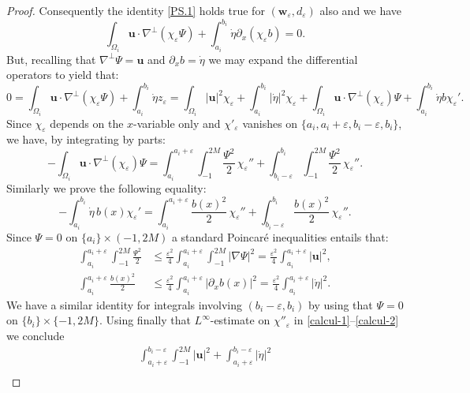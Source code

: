 \documentclass[JEP,XML,SOM,Unicode,NoFloatCountersInSection]{cedram}
\theoremstyle{remark}
\theoremstyle{definition}
\newcommand{\ug}{\boldsymbol{u}}
\newcommand{\wg}{\boldsymbol{w}}
\let\CM\Omega
\newcommand{\etap}{\dot{\eta}}
\begin{document}
\begin{proof}
Consequently the identity \eqref{PS.1} holds true for $(\wg_{\varepsilon},d_{\varepsilon})$ also and we have
\[
\int_{\CM_{i}}\ug\cdot\nabla^{\perp}(\chi_{\varepsilon}\Psi) + \int_{a_{i}}^{b_{i}}\etap \partial_x (\chi_{\varepsilon} b)=0.
\]
But, recalling that $\nabla^{\bot} \Psi = \ug$ and $\partial_x b = \dot{\eta}$ we may expand the differential operators to yield that:
\[
0 = \int_{\CM_{i}}\ug\cdot\nabla^{\perp}(\chi_{\varepsilon}\Psi) + \int_{a_{i}}^{b_{i}}\etap z_\varepsilon=\int_{\CM_{i}}\vert\ug\vert^{2}\chi_\varepsilon + \int_{a_{i}}^{b_{i}}\vert\etap\vert^{2}\chi_\varepsilon + \int_{\CM_{i}}\ug\cdot\nabla^{\perp}(\chi_{\varepsilon})\Psi + \int_{a_{i}}^{b_{i}}\etap b{\chi}_{\varepsilon}'.
\]
Since $\chi_{\varepsilon}$ depends on the $x$-variable only and $\chi'_{\varepsilon}$ vanishes on $\{a_i,a_i+ \varepsilon,b_i-\varepsilon,b_i\}$, we have, by integrating by parts:
\begin{equation}\label{calcul-1}
-\int_{\CM_{i}}\ug\cdot\nabla^{\perp}(\chi_{\varepsilon})\Psi=\int_{a_i}^{a_i+\varepsilon} \int_{-1}^{2M} \frac{\Psi^{2}}{2}\,{\chi}_{\varepsilon}''
+ \int_{b_i-\varepsilon}^{b_i} \int_{-1}^{2M} \frac{\Psi^{2}}{2}\,{\chi}_{\varepsilon}''.
\end{equation}
Similarly we prove the following equality:
\begin{equation}\label{calcul-2}-\int_{a_{i}}^{b_{i}}\etap\,b(x) {\chi}_{\varepsilon}'=
\int_{a_i}^{a_i+\varepsilon}\frac{b(x)^{2}}{2}\,{{\chi}_{\varepsilon}''}
+\int_{b_i-\varepsilon}^{b_i}\frac{b(x)^{2}}{2}\,{{\chi}_{\varepsilon}''}.
\end{equation}
Since $\Psi=0$ on $\{a_{i}\}\times(-1,2M)$
a standard Poincaré inequalities entails that:
\[\begin{aligned}
\int_{a_{i}}^{a_i+\varepsilon} \int_{-1}^{2M} \frac{\Psi^{2}}{2}&\leq \frac{\varepsilon^{2}}{4}\int_{a_{i}}^{a_i+\varepsilon} \int_{-1}^{2M}\vert\nabla\Psi\vert^{2}=\frac{\varepsilon^{2}}{4}\int_{a_{i}}^{a_i+\varepsilon}\vert\ug\vert^{2},\\
\int_{a_{i}}^{a_i+\varepsilon}\frac{b(x)^{2}}{2}&\leq\frac{\varepsilon^{2}}{4}\int_{a_{i}}^{a_i+\varepsilon}\left|\partial_{x}b(x)\right|^{2}=\frac{\varepsilon^{2}}{4}\int_{a_{i}}^{a_i+\varepsilon}\vert\etap\vert^{2}.
\end{aligned}
\]
We have a similar identity for integrals involving $(b_i-\varepsilon,b_i)$ by using that $\Psi = 0$ on $\{b_i\} \times \{-1,2M\}$. Using finally that $L^{\infty}$-estimate on ${\chi}''_{\varepsilon}$ in \eqref{calcul-1}--\eqref{calcul-2} we conclude
\begin{multline}\label{calcul-3}\int_{a_i+\varepsilon}^{b_i-\varepsilon} \int_{-1}^{2M} \vert\ug\vert^{2}+\int_{a_{i}+\varepsilon}^{b_{i}-\varepsilon}\vert\etap\vert^{2} \\

\end{multline}
\end{proof}
\end{document}
